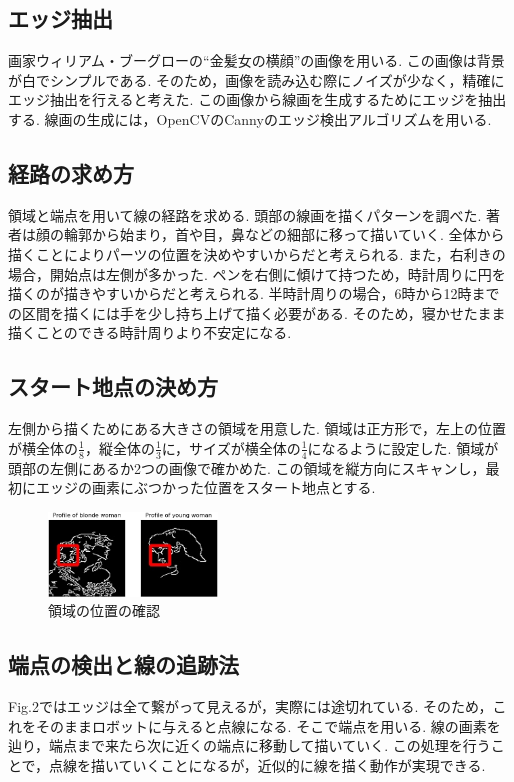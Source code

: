 \documentclass[10pt]{jarticle}
\begin{document}
	\subsection{エッジ抽出}
	画家ウィリアム・ブーグローの``金髪女の横顔''の画像を用いる.
	この画像は背景が白でシンプルである. そのため，画像を読み込む際にノイズが少なく，精確にエッジ抽出を行えると考えた.
	この画像から線画を生成するためにエッジを抽出する.
	線画の生成には，OpenCVのCannyのエッジ検出アルゴリズムを用いる.	
	\subsection{経路の求め方}
	領域と端点を用いて線の経路を求める.
	頭部の線画を描くパターンを調べた.
	著者は顔の輪郭から始まり，首や目，鼻などの細部に移って描いていく.
	全体から描くことによりパーツの位置を決めやすいからだと考えられる.
	また，右利きの場合，開始点は左側が多かった.
	ペンを右側に傾けて持つため，時計周りに円を描くのが描きやすいからだと考えられる.
	半時計周りの場合，6時から12時までの区間を描くには手を少し持ち上げて描く必要がある.
    そのため，寝かせたまま描くことのできる時計周りより不安定になる.
	\subsection{スタート地点の決め方}
	左側から描くためにある大きさの領域を用意した.
	領域は正方形で，左上の位置が横全体の$\frac{1}{8}$，縦全体の$\frac{1}{3}$に，サイズが横全体の$\frac{1}{4}$になるように設定した.
	領域が頭部の左側にあるか2つの画像で確かめた.
	この領域を縦方向にスキャンし，最初にエッジの画素にぶつかった位置をスタート地点とする.
    \begin{center}
        \begin{figure}[h]
            \includegraphics[width=0.40\textwidth]{img/003.png}
            \caption{領域の位置の確認}
            \label{the position of a region}
        \end{figure}
    \end{center}
	\subsection{端点の検出と線の追跡法}
	Fig.2ではエッジは全て繋がって見えるが，実際には途切れている. そのため，これをそのままロボットに与えると点線になる.
	そこで端点を用いる.
	線の画素を辿り，端点まで来たら次に近くの端点に移動して描いていく.
	この処理を行うことで，点線を描いていくことになるが，近似的に線を描く動作が実現できる.
\end{document}
